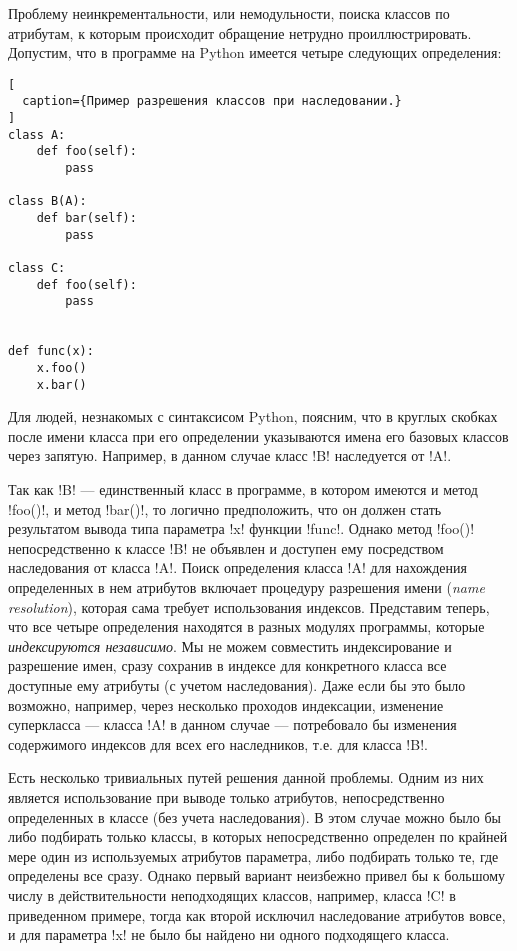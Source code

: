 Проблему неинкрементальности, или немодульности, поиска классов по атрибутам, к
которым происходит обращение нетрудно проиллюстрировать. Допустим, что в
программе на Python имеется четыре следующих определения:

\begin{lstlisting}[
  caption={Пример разрешения классов при наследовании.}
]
class A:
    def foo(self):
        pass

class B(A):
    def bar(self):
        pass

class C:
    def foo(self):
        pass


def func(x):
    x.foo()
    x.bar()

\end{lstlisting}

Для людей, незнакомых с синтаксисом Python, поясним, что в круглых скобках после
имени класса при его определении указываются имена его базовых классов
через запятую. Например, в данном случае класс !B! наследуется от !A!.

Так как !B! --- единственный класс в программе, в котором имеются и метод
!foo()!, и метод !bar()!, то логично предположить, что он должен стать
результатом вывода типа параметра !x!  функции !func!. Однако метод !foo()!
непосредственно к классе !B!  не объявлен и доступен ему посредством
наследования от класса !A!. Поиск определения класса !A! для нахождения
определенных в нем атрибутов включает процедуру разрешения имени (\emph{name
  resolution}), которая сама требует использования индексов.  Представим теперь,
что все четыре определения находятся в разных модулях программы, которые
\emph{индексируются независимо}. Мы не можем совместить индексирование и
разрешение имен, сразу сохранив в индексе для конкретного класса все доступные
ему атрибуты (с учетом наследования).  Даже если бы это было возможно, например,
через несколько проходов индексации, изменение суперкласса --- класса !A! в
данном случае --- потребовало бы изменения содержимого индексов для всех его
наследников, т.е. для класса !B!. 

Есть несколько тривиальных путей решения данной проблемы. Одним из них является
использование при выводе только атрибутов, непосредственно определенных в классе
(без учета наследования). В этом случае можно было бы либо подбирать только
классы, в которых непосредственно определен по крайней мере один из используемых
атрибутов параметра, либо подбирать только те, где определены все сразу. Однако
первый вариант неизбежно привел бы к большому числу в действительности
неподходящих классов, например, класса !C! в приведенном примере, тогда как второй
исключил наследование атрибутов вовсе, и для параметра !x! не было бы
найдено ни одного подходящего класса.

